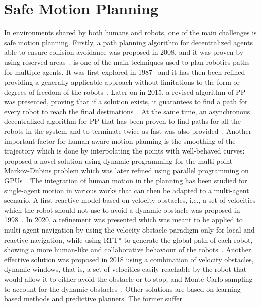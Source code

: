 \section{Safe Motion Planning}
In environments shared by both humans and robots, one of the main challenges is
safe motion planning. Firstly, a path planning algorithm for decentralized 
agents able to ensure collision avoidance was proposed in 2008, and it was 
proven by using reserved areas~\cite{purwin2008}.  is one of the main 
techniques used to plan robotics paths for multiple agents. It was first
explored in 1987~\cite{erdmann1987} and it has then been refined providing a
generally applicable approach without limitations to the form or degrees of
freedom of the robots~\cite{vandenberg2005}. Later on in 2015, a revised
algorithm of PP was presented, proving that if a solution exists, it guarantees
to find a path for every robot to reach the final
destinations~\cite{michal2015}. At the same time, an asynchronous decentralized
algorithm for PP that has been proven to find paths for all the robots in the
system and to terminate twice as fast was also provided~\cite{michal2015}.
Another important factor for human-aware motion planning is the smoothing of
the trajectory which is done by interpolating the points with well-behaved
curves:~\cite{frego2020} proposed a novel solution using dynamic programming
for the multi-point Markov-Dubins problem which was later refined using
parallel programming on GPUs~\cite{saccon2021}. \newline
The integration of human motion in the planning has been studied for
single-agent motion in various works that can then be adapted to a multi-agent
scenario. A first reactive model based on velocity obstacles, i.e., a set of
velocities which the robot should not use to avoid a dynamic obstacle was
proposed in 1998~\cite{fiorini1998}. In 2020, a refinement was presented which
was meant to be applied to multi-agent navigation by using the velocity
obstacle paradigm only for local and reactive navigation, while using RTT* to
generate the global path of each robot, showing a more human-like and
collaborative behaviour of the robots~\cite{boldrer2020}. Another effective
solution was proposed in 2018 using a combination of velocity obstacles,
dynamic windows, that is, a set of velocities easily reachable by the robot
that would allow it to either avoid the obstacle or to stop, and Monte Carlo
sampling to account for the dynamic obstacles~\cite{claes2018}. Other solutions
are based on learning-based methods and predictive planners. The former suffer
